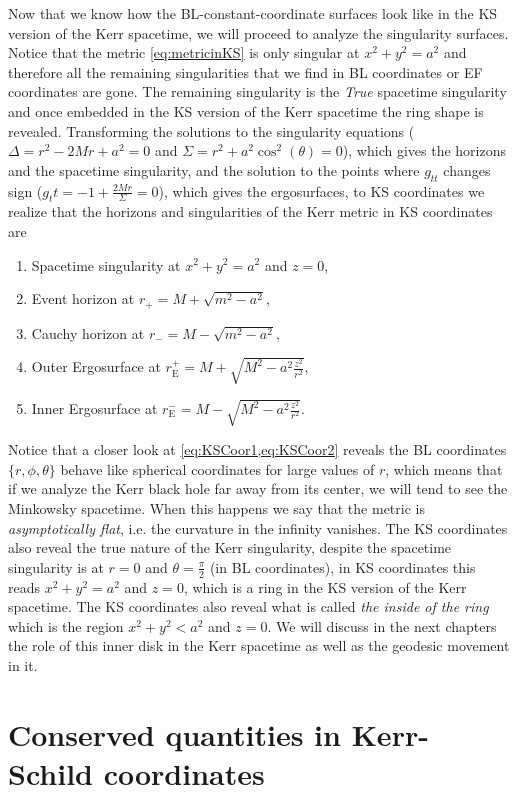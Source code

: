Now that we know how the \gls{BL}-constant-coordinate surfaces look like in the \gls{KS} version of the Kerr spacetime, we will proceed to analyze the singularity surfaces. Notice that the metric \ref{eq:metricinKS} is only singular at $x^2+y^2=a^2$ and therefore all the remaining singularities that we find in \gls{BL} coordinates or \gls{EF} coordinates are gone. The remaining singularity is the \textit{True} spacetime singularity and once embedded in the \gls{KS} version of the Kerr spacetime the ring shape is revealed. Transforming the solutions to the singularity equations ($\Delta=r^2-2 M r+a^2=0$ and $\Sigma=r^2+a^2 \cos^2{(\theta)}=0$), which gives the horizons and the spacetime singularity, and the solution to the points where $g_{tt}$ changes sign ($g_tt=-1+\frac{2Mr}{\Sigma}=0$), which gives the ergosurfaces, to \gls{KS} coordinates we realize that the horizons and singularities of the Kerr metric in \gls{KS} coordinates are
\begin{enumerate}
 \item Spacetime singularity at $x^2+y^2=a^2$ and $z=0$,
 \item Event horizon at $r_+=M+\sqrt{m^2-a^2}$,
 \item Cauchy horizon at $r_-=M-\sqrt{m^2-a^2}$,
 \item Outer Ergosurface at $r_\text{E}^+=M+\sqrt{M^2-a^2 \frac{z^2}{r^2}}$,
  \item Inner Ergosurface at $r_\text{E}^-=M-\sqrt{M^2-a^2 \frac{z^2}{r^2}}$.
\end{enumerate}
Notice that a closer look at \cref{eq:KSCoor1,eq:KSCoor2} reveals the \gls{BL} coordinates $\{r,\phi,\theta\}$ behave like spherical coordinates for large values of $r$, which means that if we analyze the Kerr black hole far away from its center, we will tend to see the Minkowsky spacetime. When this happens we say that the metric is \textit{asymptotically flat}, i.e. the curvature in the infinity vanishes. The \gls{KS} coordinates also reveal the true nature of the Kerr singularity, despite the spacetime singularity is at $r=0$ and $\theta=\frac{\pi}{2}$ (in \gls{BL} coordinates), in \gls{KS} coordinates this reads $x^2+y^2=a^2$ and $z=0$, which is a ring in the \gls{KS} version of the Kerr spacetime. The \gls{KS} coordinates also reveal what is called \textit{the inside of the ring} which is the region $x^2+y^2<a^2$ and $z=0$. We will discuss in the next chapters the role of this inner disk in the Kerr spacetime as well as the geodesic movement in it.

\section{Conserved quantities in Kerr-Schild coordinates}


